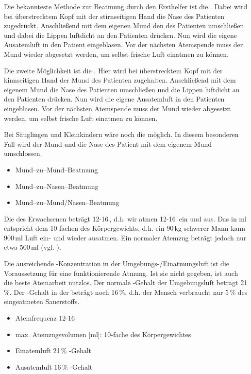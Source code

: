 {
Die bekannteste Methode zur Beatmung durch den Ersthelfer ist die
. Dabei wird bei überstrecktem Kopf mit der stirnseitigen Hand die Nase des Patienten zugedrückt. Anschließend mit dem eigenen Mund den des Patienten umschließen und
dabei die Lippen luftdicht an den Patienten drücken. Nun
wird die eigene Ausatemluft in den Patient eingeblasen. Vor der nächsten Atemspende
muss der Mund wieder abgesetzt werden, um selbst frische Luft einatmen zu
können. 

Die zweite Möglichkeit ist die . Hier wird bei überstrecktem Kopf mit der kinnseitigen Hand der Mund des Patienten
zugehalten. Anschließend mit dem eigenem Mund die Nase des Patienten umschließen und die Lippen luftdicht an den Patienten drücken. Nun wird die eigene
Ausatemluft in den Patienten eingeblasen. Vor der nächsten Atemspende
muss der Mund wieder abgesetzt werden, um selbst frische Luft einatmen zu
können. 

Bei Säuglingen und Kleinkindern wäre noch die
 möglich. In diesem
besonderen Fall wird der Mund und die Nase des Patient mit dem eigenem Mund umschlossen.
}{
\begin{itemize}
    \item Mund--zu--Mund--Beatmung
    \item Mund--zu--Nasen--Beatmung
    \item Mund--zu--Mund/Nasen--Beatmung
\end{itemize}
}{}{}{}

{
Die  des Erwachsenen beträgt 12-16\,, d.h.
wir atmen 12-16\, ein und aus. Das  in ml entspricht dem 10-fachen des Körpergewichts, d.h. ein
90\,kg schwerer Mann kann 900\,ml Luft ein- und wieder ausatmen. Ein normaler
Atemzug beträgt jedoch nur etwa 500\,ml (vgl. ).

Die ausreichende -Konzentration in der Umgebungs-/Einatmungsluft ist die
Voraussetzung für eine funktionierende Atmung. Ist sie
nicht gegeben, ist auch die beste Atemarbeit nutzlos. Der normale -Gehalt der Umgebungsluft beträgt
21\,\%. Der -Gehalt in der  beträgt
noch 16\,\%, d.h. der Mensch verbraucht  nur 5\,\% des
eingeatmeten Sauerstoffs. 
}{
\begin{itemize}
	\item Atemfrequenz 12-16\,
	\item max. Atemzugsvolumen [ml]: 10-fache des Körpergewichtes
	\item Einatemluft 21\,\% -Gehalt
	\item Ausatemluft 16\,\% -Gehalt
\end{itemize}
}{}{}{}

